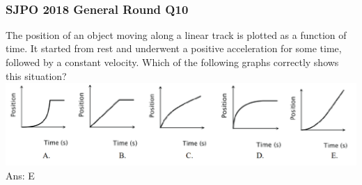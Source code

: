 \documentclass{article}
\begin{document}
\\[20pt]
\begin{samepage}
\subsubsection{SJPO 2018 General Round Q10} The position of an object moving along a linear track is plotted as a function of time. It started from rest and underwent a positive acceleration for some time, followed by a constant velocity. Which of the following graphs correctly shows this situation?\\
\includegraphics[width=\linewidth]{2018q10.png}\\
Ans: E\\
\end{samepage}
\end{document}
